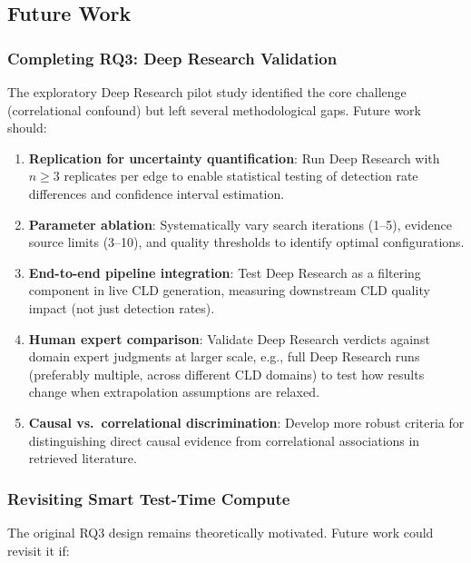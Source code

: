 \subsection{Future Work}

\subsubsection{Completing RQ3: Deep Research Validation}

The exploratory Deep Research pilot study identified the core challenge (correlational confound) but left several methodological gaps. Future work should:

\begin{enumerate}[noitemsep]
    \item \textbf{Replication for uncertainty quantification}: Run Deep Research with $n \geq 3$ replicates per edge to enable statistical testing of detection rate differences and confidence interval estimation.
    \item \textbf{Parameter ablation}: Systematically vary search iterations (1--5), evidence source limits (3--10), and quality thresholds to identify optimal configurations.
    \item \textbf{End-to-end pipeline integration}: Test Deep Research as a filtering component in live CLD generation, measuring downstream CLD quality impact (not just detection rates).
    \item \textbf{Human expert comparison}: Validate Deep Research verdicts against domain expert judgments at larger scale, e.g., full Deep Research runs (preferably multiple, across different CLD domains) to test how results change when extrapolation assumptions are relaxed.
    \item \textbf{Causal vs.\ correlational discrimination}: Develop more robust criteria for distinguishing direct causal evidence from correlational associations in retrieved literature.
\end{enumerate}

\subsubsection{Revisiting Smart Test-Time Compute}

The original RQ3 design remains theoretically motivated. Future work could revisit it if:

